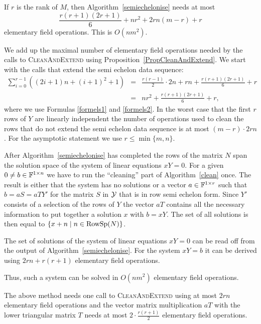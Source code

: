 \begin{Prop}
\label{semiechelon}
If $r$ is the rank of $M$, then Algorithm~\ref{semiechelonise} needs
at most
\[ \frac{r(r+1)(2r+1)}{6} + nr^2 + 2rn(m-r) + r \]
elementary field operations. This is $O(nm^2)$.
\end{Prop}
\proofbeg
We add up the maximal number of elementary field operations needed
by the calls to \textsc{CleanAndExtend} using
Proposition~\ref{PropCleanAndExtend}. We start with the calls that
extend the semi echelon data sequence:
\begin{eqnarray*}
\sum_{i=0}^{r-1} \left( (2i+1)n + (i+1)^2 + 1 \right) 
  &=& \frac{r(r-1)}{2} \cdot 2n + rn + \frac{r(r+1)(2r+1)}{6} + r \\
  &=& nr^2 + \frac{r(r+1)(2r+1)}{6} + r,
\end{eqnarray*}
where we use Formulas \ref{formels1} and \ref{formels2}. In the worst
case that the first $r$ rows of $Y$ are linearly independent the
number of operations used to clean the rows that do not extend
the semi echelon data sequence is at most $(m-r)\cdot 2rn$.
For the asymptotic statement we use $r \le \min\{ m,n \}$.
\proofend

\medskip
After Algorithm~\ref{semiechelonise} has completed the rows of the
matrix $N$ span the solution space of the system of linear equations
$xY = 0$. For a given $0 \neq b \in \mathbb{F}^{1 \times n}$ we have to run
the ``cleaning'' part of Algorithm~\ref{clean} once.
The result is either that the system has no solutions or a vector
$a \in \mathbb{F}^{1 \times r}$ such that $b = aS = aTY'$ for the matrix $S$ in
$\mathcal{Y}$ that is in row semi echelon form. Since $Y'$ consists of a 
selection of the rows of $Y$ the vector $aT$ contains all the necessary
information to put together a solution $x$ with $b = xY$. The set
of all solutions is then equal to $\{ x+n \mid n \in \mathrm{RowSp}(N) \}$.

\begin{Cor}
\label{solvelinsys}
The set of solutions of the system of linear equations $xY=0$ can be
read off from the output of Algorithm~\ref{semiechelonise}. For
the system $xY=b$ it can be derived using
$2rn + r(r+1)$ elementary field operations.

Thus, such a system can be solved in $O(nm^2)$ elementary field operations.
\end{Cor}
\proofbeg
The above method needs one call to \textsc{CleanAndExtend} using at most
$2rn$ elementary field operations and the vector matrix multiplication
$aT$ with the lower triangular matrix $T$ needs at most
$2\cdot \frac{r(r+1)}{2}$ elementary field operations.
\proofend

